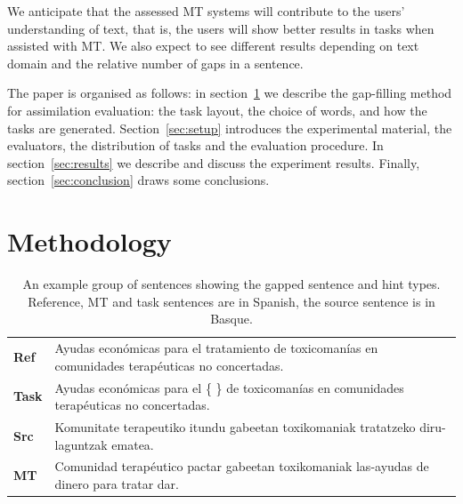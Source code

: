 \documentclass[11pt]{article}
\begin{document}
We anticipate that the assessed MT systems will contribute to the users' understanding of text, that is, the users will show better results in tasks when assisted with MT. We also expect to see different results depending on text domain and the relative number of gaps in a sentence.

The paper is organised as follows: in section~\ref{sec:methodology} we describe the gap-filling method for assimilation evaluation: the task layout, the choice of words, and how the tasks are generated. Section~\ref{sec:setup} introduces the experimental material, the evaluators, the distribution of tasks and the evaluation procedure. In section~\ref{sec:results} we describe and discuss the experiment results. Finally, section~\ref{sec:conclusion} draws some conclusions.


\section{Methodology}
\label{sec:methodology}

\begin{table}
  \centering
  \begin{tabular}{|l|l|}
     \hline
     \textbf{Ref}  & Ayudas econ\'{o}micas para el tratamiento de toxicoman\'{i}as en comunidades terap\'{e}uticas no concertadas. \\
     \textbf{Task} & Ayudas econ\'{o}micas para el \{ \} de toxicoman\'{i}as en comunidades terap\'{e}uticas no concertadas. \\
     \textbf{Src}  & Komunitate terapeutiko itundu gabeetan toxikomaniak tratatzeko diru-laguntzak ematea. \\
     \textbf{MT}   & Comunidad terap\'{e}utico pactar gabeetan toxikomaniak las-ayudas de dinero para tratar dar. \\
     \hline
  \end{tabular}
  \caption{An example group of sentences showing the gapped sentence and hint types. Reference, MT and task sentences are in Spanish, the source sentence is in Basque.} 
  \label{table:example}
\end{table}
\end{document}
